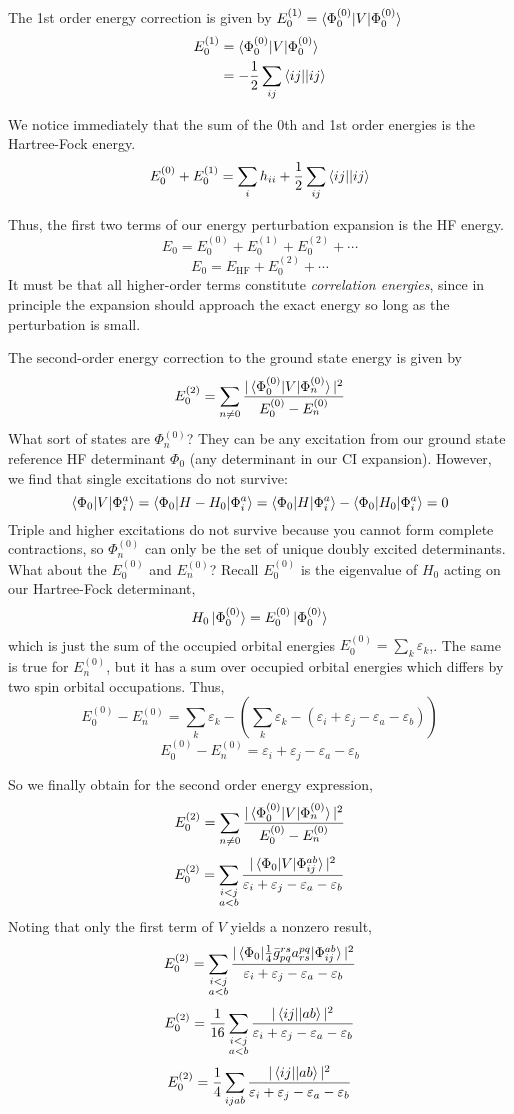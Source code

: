 \documentclass{article}
\newcommand{\eps}{\varepsilon}
\newcommand{\Ezero}{E^{(0)}}
\newcommand{\Phizero}{\Phi^{(0)}}
\begin{document}
The 1st order energy correction is given by $E_0^{(1)} = \braket{\Phi_0^{(0)} | V | \Phi_0^{(0)}}$
\begin{align*}
E_0^{(1)} &= \braket{\Phi_0^{(0)} | V | \Phi_0^{(0)}} \\
          &= -\frac{1}{2} \sum_{ij} \braket{ij||ij} 
\end{align*}

We notice immediately that the sum of the 0th and 1st order energies is the Hartree-Fock energy.
\[ E_0^{(0)} + E_0^{(1)} = \sum_i h_{ii} + \frac{1}{2}\sum_{ij} \braket{ij||ij}   \] 

Thus, the first two terms of our energy perturbation expansion is the HF energy.
\[E_0 =  E_0^{(0)} +  E_0^{(1)} + E_0^{(2)} + \cdots \]
\[E_0 =  E_{\mathrm{HF}} + E_0^{(2)} + \cdots \]
It must be that all higher-order terms constitute \textit{correlation energies}, since in principle the expansion should approach the exact 
    energy so long as the perturbation is small.

The second-order energy correction to the ground state energy is given by 
\[ E_0^{(2)} = \sum_{n \neq 0} \frac{ |\braket{ \Phizero_0 | V | \Phizero_n} |^2  }{ \Ezero_0 - \Ezero_n}  \]
What sort of states are $\Phizero_n$? They can be any excitation from our ground state reference HF determinant $\Phi_0$ (any determinant in our CI expansion).
However, we find that single excitations do not survive:
\[ \braket{\Phi_0 | V | \Phi_i^a } =  \braket{\Phi_0 | H - H_0 | \Phi_i^a } = \braket{\Phi_0 | H | \Phi_i^a } - \braket{\Phi_0 | H_0 | \Phi_i^a }  = 0 \]
Triple and higher excitations do not survive because you cannot form complete contractions, so $\Phizero_n$ can only be the set of unique doubly excited determinants. 
What about the $\Ezero_0$ and $\Ezero_n $?
Recall $\Ezero_0$ is the eigenvalue of $H_0$ acting on our Hartree-Fock determinant,
\[H_0 \ket{\Phi_0^{(0)}} = E_0^{(0)} \ket{\Phi_0^{(0)}} \]
 which is just the sum of the occupied orbital energies $E_0^{(0)} = \sum_k \eps_k$,.
The same is true for $\Ezero_n$, but it has a sum over occupied orbital energies which differs by two spin orbital occupations. Thus,
\[\Ezero_0 - \Ezero_n =  \sum_k \eps_k - ( \sum_k \eps_k - (\eps_i + \eps_j - \eps_a - \eps_b)) \]
\[\Ezero_0 - \Ezero_n =  \eps_i + \eps_j - \eps_a - \eps_b \]

So we finally obtain for the second order energy expression,
\[ E_0^{(2)} = \sum_{n \neq 0} \frac{ |\braket{ \Phizero_0 | V | \Phizero_n} |^2  }{ \Ezero_0 - \Ezero_n}  \]
\[ E_0^{(2)} = \sum_{\substack{i < j \\ a < b}} \frac{ |\braket{ \Phi_0 | V | \Phi_{ij}^{ab}} |^2}{ \eps_i + \eps_j - \eps_a - \eps_b  }  \]
Noting that only the first term of $V$ yields a nonzero result,
\[ E_0^{(2)} = \sum_{\substack{i < j \\ a < b}} \frac{ |\braket{ \Phi_0 | \frac{1}{4} \bar{g}_{pq}^{rs} a_{rs}^{pq} | \Phi_{ij}^{ab}} |^2}{ \eps_i + \eps_j - \eps_a - \eps_b  }  \]
\[ E_0^{(2)} = \frac{1}{16} \sum_{\substack{i < j \\ a < b}}  \frac{ |\braket{ ij || ab}|^2}{ \eps_i + \eps_j - \eps_a - \eps_b}\]
\[ E_0^{(2)} = \frac{1}{4} \sum_{ijab} \frac{ |\braket{ ij || ab}|^2}{ \eps_i + \eps_j - \eps_a - \eps_b}\]
\end{document}
